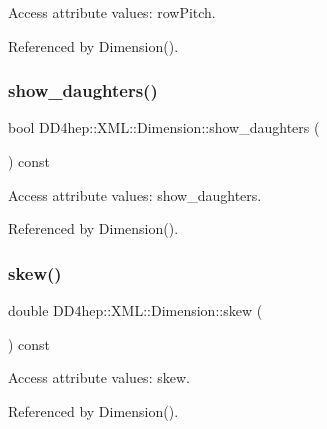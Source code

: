 Access attribute values\+: row\+Pitch. 



Referenced by Dimension().

\hypertarget{struct_d_d4hep_1_1_x_m_l_1_1_dimension_a1a86368775d21b14a7e6578e032400c7}{}\label{struct_d_d4hep_1_1_x_m_l_1_1_dimension_a1a86368775d21b14a7e6578e032400c7} 
\subsubsection{\texorpdfstring{show\+\_\+daughters()}{show\_daughters()}}
{\footnotesize\ttfamily bool D\+D4hep\+::\+X\+M\+L\+::\+Dimension\+::show\+\_\+daughters (\begin{DoxyParamCaption}{ }\end{DoxyParamCaption}) const}



Access attribute values\+: show\+\_\+daughters. 



Referenced by Dimension().

\hypertarget{struct_d_d4hep_1_1_x_m_l_1_1_dimension_ae80086c488af219f981bcdd351064e60}{}\label{struct_d_d4hep_1_1_x_m_l_1_1_dimension_ae80086c488af219f981bcdd351064e60} 
\subsubsection{\texorpdfstring{skew()}{skew()}\hspace{0.1cm}{\footnotesize\ttfamily [1/2]}}
{\footnotesize\ttfamily double D\+D4hep\+::\+X\+M\+L\+::\+Dimension\+::skew (\begin{DoxyParamCaption}{ }\end{DoxyParamCaption}) const}



Access attribute values\+: skew. 



Referenced by Dimension().

\hypertarget{struct_d_d4hep_1_1_x_m_l_1_1_dimension_a3a1c68aa860ce4d58e890f71a3e49ff4}{}\label{struct_d_d4hep_1_1_x_m_l_1_1_dimension_a3a1c68aa860ce4d58e890f71a3e49ff4} 
